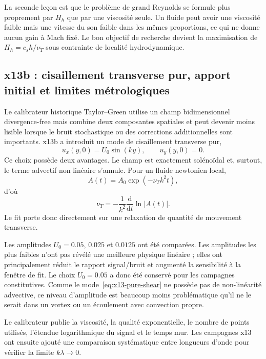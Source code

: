 \documentclass[11pt,a4paper]{article}
\begin{document}
La seconde leçon est que le problème de grand Reynolds se formule plus proprement par $H_h$ que par une viscosité seule. Un fluide peut avoir une viscosité faible mais une vitesse du son faible dans les mêmes proportions, ce qui ne donne aucun gain à Mach fixé. Le bon objectif de recherche devient la maximisation de $H_h=c_s h/\nu_T$ sous contrainte de localité hydrodynamique.

\subsection{x13b : cisaillement transverse pur, apport initial et limites métrologiques}

Le calibrateur historique Taylor--Green utilise un champ bidimensionnel divergence-free mais combine deux composantes spatiales et peut devenir moins lisible lorsque le bruit stochastique ou des corrections additionnelles sont importants. x13b a introduit un mode de cisaillement transverse pur,
\begin{equation}
  u_x(y,0)=U_0\sin(ky),
  \qquad
  u_y(y,0)=0.
  \label{eq:x13-pure-shear}
\end{equation}
Ce choix possède deux avantages. Le champ est exactement solénoïdal et, surtout, le terme advectif non linéaire s'annule. Pour un fluide newtonien local,
\begin{equation}
  A(t)=A_0\exp(-\nu_T k^2t),
\end{equation}
d'où
\begin{equation}
  \boxed{
  \nu_T
  =
  -\frac{1}{k^2}
  \frac{\mathrm d}{\mathrm dt}\ln|A(t)|.
  }
  \label{eq:x13-nuT}
\end{equation}
Le fit porte donc directement sur une relaxation de quantité de mouvement transverse.

Les amplitudes $U_0=0.05$, $0.025$ et $0.0125$ ont été comparées. Les amplitudes les plus faibles n'ont pas révélé une meilleure physique linéaire ; elles ont principalement réduit le rapport signal/bruit et augmenté la sensibilité à la fenêtre de fit. Le choix $U_0=0.05$ a donc été conservé pour les campagnes constitutives. Comme le mode~\eqref{eq:x13-pure-shear} ne possède pas de non-linéarité advective, ce niveau d'amplitude est beaucoup moins problématique qu'il ne le serait dans un vortex ou un écoulement avec convection propre.

Le calibrateur publie la viscosité, la qualité exponentielle, le nombre de points utilisés, l'étendue logarithmique du signal et le temps mur. Les campagnes x13 ont ensuite ajouté une comparaison systématique entre longueurs d'onde pour vérifier la limite $k\lambda\rightarrow0$.
\end{document}
